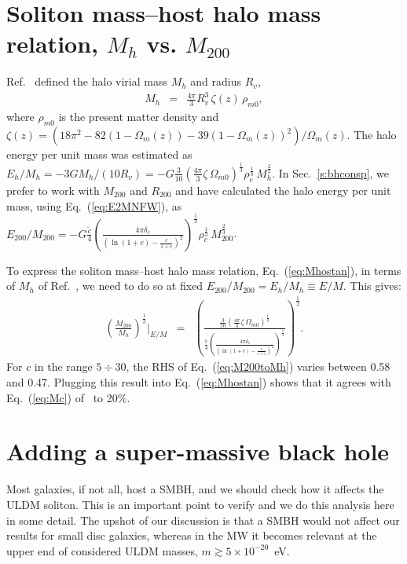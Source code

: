 \documentclass[aps,prd,floats,superscriptaddress,showpacs,nofootinbib,twocolumn,preprintnumbers]{revtex4-1}%
\def\be{\begin{eqnarray}}
\def\ee{\end{eqnarray}}
\begin{document}
%
\begin{appendix}
%

\section{Soliton mass--host halo mass relation, $M_h$ vs. $M_{200}$}\label{app:MhM200}
%

Ref.~\cite{Schive:2014hza} defined the halo virial mass $M_h$ and radius $R_v$,
%
\be M_h&=&\frac{4\pi}{3}R_v^3\,\zeta(z)\,\rho_{m0},\ee
%
where $\rho_{m0}$ is the present matter density and
$\zeta(z)=(18\pi^2-82(1-\Omega_m(z))-39(1-\Omega_m(z))^2)/\Omega_m(z)$. 
The halo energy per unit mass was estimated as $E_h/M_h=-3GM_h/(10R_v)=-G\frac{3}{10}\left(\frac{4\pi}{3}\zeta\,\Omega_{m0}\right)^{\frac{1}{3}}\rho_c^{\frac{1}{3}}\,M_h^{\frac{2}{3}}$. 
%
In Sec.~\ref{s:bhconsp}, we prefer to work with $M_{200}$ and
$R_{200}$ and have calculated the halo energy per unit mass, using
Eq.~(\ref{eq:E2MNFW}), as $E_{200}/M_{200}=-G\frac{\tilde c}{4}\left(\frac{4\pi\delta_c}{\left(\ln(1+c)-\frac{c}{1+c}\right)^2}\right)^{\frac{1}{3}}\rho_c^{\frac{1}{3}}\,M_{200}^{\frac{2}{3}}$. 

To express the soliton mass--host halo mass relation,
Eq.~(\ref{eq:Mhostan}), in terms of $M_h$ of
Ref.~\cite{Schive:2014hza}, we need to do so at fixed
$E_{200}/M_{200}=E_h/M_h\equiv E/M$. This gives: 
%
\be\label{eq:M200toMh}
\left(\frac{M_{200}}{M_h}\right)^{\frac{1}{3}}\bigg|_{E/M}&=&\left(\frac{\frac{3}{10}\left(\frac{4\pi}{3}\zeta\,\Omega_{m0}\right)^{\frac{1}{3}}}{\frac{\tilde c}{4}\left(\frac{4\pi\delta_c}{\left(\ln(1+c)-\frac{c}{1+c}\right)^2}\right)^{\frac{1}{3}}}\right)^{\frac{1}{2}}.
%
\ee 
%
For $c$ in the range $5\div 30$, the RHS of Eq.~(\ref{eq:M200toMh}) varies
between 0.58 and 0.47. Plugging this result into
Eq.~(\ref{eq:Mhostan}) shows that it agrees with Eq.~(\ref{eq:Mc})
of~\cite{Schive:2014hza} to 20\%. 



\section{Adding a super-massive black hole}\label{ss:smbh}
%
Most galaxies, if not all, host a SMBH, and we should check how it
affects the ULDM soliton. 
This is an important point to verify and we do this analysis here in
some detail. 
The upshot of our discussion is that a SMBH would not affect our
  results for small disc galaxies, whereas in the MW it becomes relevant
  at the upper end of considered ULDM masses, $m\gtrsim 5\times
  10^{-20}$~eV.  


\end{appendix}
\end{document}
